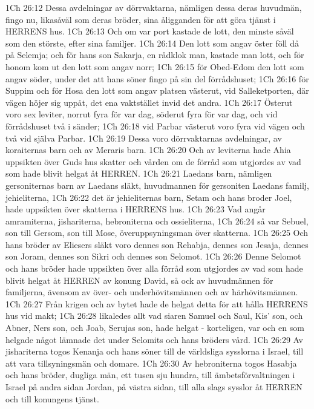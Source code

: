 1Ch 26:12  Dessa avdelningar av dörrvaktarna, nämligen dessa deras huvudmän, fingo nu, likasåväl som deras bröder, sina åligganden för att göra tjänst i HERRENS hus.
1Ch 26:13  Och om var port kastade de lott, den minste såväl som den störste, efter sina familjer.
1Ch 26:14  Den lott som angav öster föll då på Selemja; och för hans son Sakarja, en rådklok man, kastade man lott, och för honom kom ut den lott som angav norr;
1Ch 26:15  för Obed-Edom den lott som angav söder, under det att hans söner fingo på sin del förrådshuset;
1Ch 26:16  för Suppim och för Hosa den lott som angav platsen västerut, vid Salleketporten, där vägen höjer sig uppåt, det ena vaktstället invid det andra.
1Ch 26:17  Österut voro sex leviter, norrut fyra för var dag, söderut fyra för var dag, och vid förrådshuset två i sänder;
1Ch 26:18  vid Parbar västerut voro fyra vid vägen och två vid själva Parbar.
1Ch 26:19  Dessa voro dörrvaktarnas avdelningar, av koraiternas barn och av Meraris barn.
1Ch 26:20  Och av leviterna hade Ahia uppsikten över Guds hus skatter och vården om de förråd som utgjordes av vad som hade blivit helgat åt HERREN.
1Ch 26:21  Laedans barn, nämligen gersoniternas barn av Laedans släkt, huvudmannen för gersoniten Laedans familj, jehieliterna,
1Ch 26:22  det är jehieliternas barn, Setam och hans broder Joel, hade uppsikten över skatterna i HERRENS hus.
1Ch 26:23  Vad angår amramiterna, jishariterna, hebroniterna och ossieliterna,
1Ch 26:24  så var Sebuel, son till Gersom, son till Mose, överuppsyningsman över skatterna.
1Ch 26:25  Och hans bröder av Eliesers släkt voro dennes son Rehabja, dennes son Jesaja, dennes son Joram, dennes son Sikri och dennes son Selomot.
1Ch 26:26  Denne Selomot och hans bröder hade uppsikten över alla förråd som utgjordes av vad som hade blivit helgat åt HERREN av konung David, så ock av huvudmännen för familjerna, ävensom av över- och underhövitsmännen och av härhövitsmännen.
1Ch 26:27  Från krigen och av bytet hade de helgat detta för att hålla HERRENS hus vid makt;
1Ch 26:28  likaledes allt vad siaren Samuel och Saul, Kis' son, och Abner, Ners son, och Joab, Serujas son, hade helgat - korteligen, var och en som helgade något lämnade det under Selomits och hans bröders vård.
1Ch 26:29  Av jishariterna togos Kenanja och hans söner till de världsliga sysslorna i Israel, till att vara tillsyningsmän och domare.
1Ch 26:30  Av hebroniterna togos Hasabja och hans bröder, dugliga män, ett tusen sju hundra, till ämbetsförvaltningen i Israel på andra sidan Jordan, på västra sidan, till alla slags sysslor åt HERREN och till konungens tjänst.
